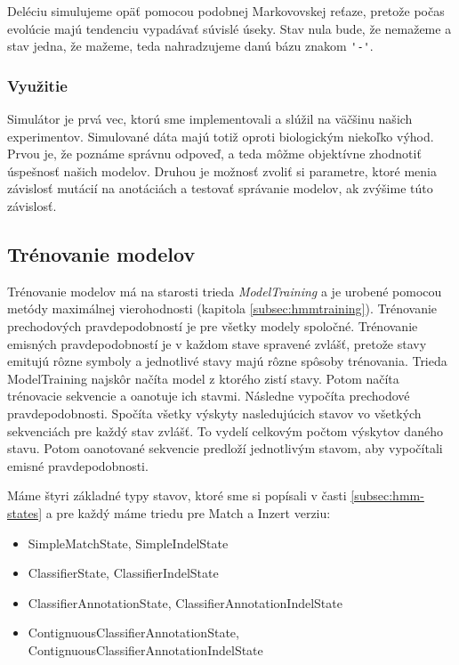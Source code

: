 Deléciu simulujeme opäť pomocou podobnej Markovovskej reťaze, pretože počas evolúcie majú tendenciu vypadávať súvislé úseky. Stav nula bude, že nemažeme a stav jedna, že mažeme, teda nahradzujeme danú bázu znakom {\verb+'-'+}.

\subsubsection{Využitie}

Simulátor je prvá vec, ktorú sme implementovali a slúžil na väčšinu našich experimentov. Simulované dáta majú totiž oproti biologickým niekoľko výhod. Prvou je, že poznáme správnu odpoveď, a teda môžme objektívne zhodnotiť úspešnosť našich modelov. Druhou je možnosť zvoliť si parametre, ktoré menia závislosť mutácií na anotáciách a testovať správanie modelov, ak zvýšime túto závislosť.

\subsection{Trénovanie modelov}
\label{subsec:impl-model-traioning}

Trénovanie modelov má na starosti trieda \textit{ModelTraining} a je urobené pomocou metódy maximálnej vierohodnosti (kapitola \ref{subsec:hmmtraining}).
Trénovanie prechodových pravdepodobností je pre všetky modely spoločné. Trénovanie emisných pravdepodobností je v každom stave spravené zvlášť, pretože stavy emitujú rôzne symboly a jednotlivé stavy majú rôzne spôsoby trénovania.
Trieda ModelTraining najskôr načíta model z ktorého zistí stavy.
Potom načíta trénovacie sekvencie a oanotuje ich stavmi. Následne vypočíta prechodové pravdepodobnosti. Spočíta všetky výskyty nasledujúcich stavov vo všetkých sekvenciách pre každý stav zvlášť. To vydelí celkovým počtom výskytov daného stavu. Potom oanotované sekvencie predloží jednotlivým stavom, aby vypočítali emisné pravdepodobnosti.

Máme štyri základné typy stavov, ktoré sme si popísali v časti \ref{subsec:hmm-states} a pre každý máme triedu pre Match a Inzert verziu:
\begin{itemize}
    \item SimpleMatchState, SimpleIndelState
    \item ClassifierState, ClassifierIndelState
    \item ClassifierAnnotationState, ClassifierAnnotationIndelState
    \item ContignuousClassifierAnnotationState, ContignuousClassifierAnnotationIndelState
\end{itemize}

